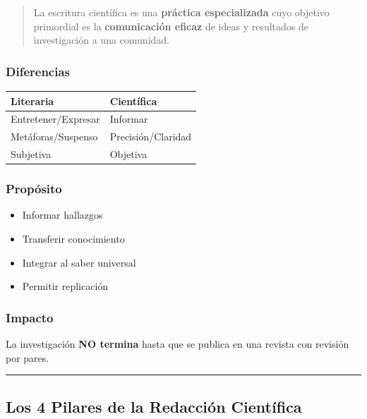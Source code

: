 \documentclass[
  11pt,
]{beaner}
\providecommand{\tightlist}{%
  \setlength{\itemsep}{0pt}\setlength{\parskip}{0pt}}
\begin{document}
\begin{quote}
La escritura científica es una \textbf{práctica especializada} cuyo
objetivo primordial es la \textbf{comunicación eficaz} de ideas y
resultados de investigación a una comunidad.
\end{quote}

\subsubsection{Diferencias}\label{diferencias}

\begin{longtable}[]{@{}ll@{}}
\toprule\noalign{}
Literaria & Científica \\
\midrule\noalign{}
\endhead
\bottomrule\noalign{}
\endlastfoot
Entretener/Expresar & Informar \\
Metáforas/Suspenso & Precisión/Claridad \\
Subjetiva & Objetiva \\
\end{longtable}

\subsubsection{Propósito}\label{propuxf3sito}

\begin{itemize}
\tightlist
\item
  Informar hallazgos
\item
  Transferir conocimiento
\item
  Integrar al saber universal
\item
  Permitir replicación
\end{itemize}

\subsubsection{Impacto}\label{impacto}

La investigación \textbf{NO termina} hasta que se publica en una revista
con revisión por pares.

\begin{center}\rule{0.5\linewidth}{0.5pt}\end{center}

\subsection{Los 4 Pilares de la Redacción
Científica}\label{los-4-pilares-de-la-redacciuxf3n-cientuxedfica}
\end{document}
